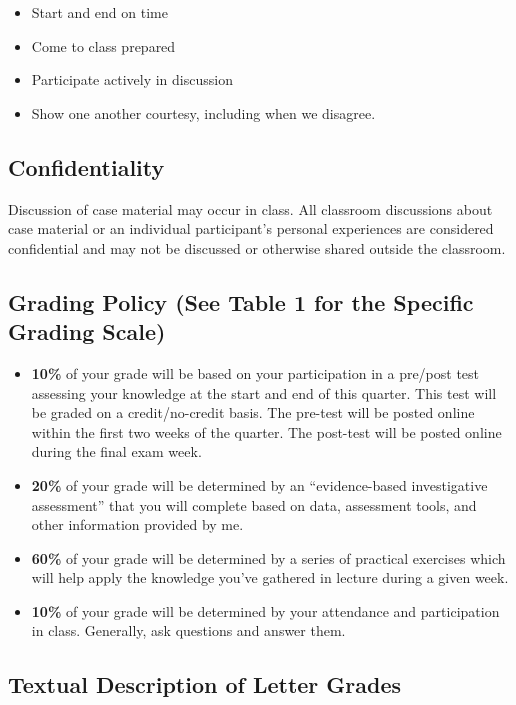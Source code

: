 \documentclass[11pt,]{article}
\providecommand{\tightlist}{%
  \setlength{\itemsep}{0pt}\setlength{\parskip}{0pt}}
\begin{document}
\begin{itemize}
\tightlist
\item
  Start and end on time
\item
  Come to class prepared
\item
  Participate actively in discussion
\item
  Show one another courtesy, including when we disagree.
\end{itemize}

\subsection{Confidentiality}\label{confidentiality}

Discussion of case material may occur in class. All classroom
discussions about case material or an individual participant's personal
experiences are considered confidential and may not be discussed or
otherwise shared outside the classroom.

\subsection{Grading Policy (See Table 1 for the Specific Grading
Scale)}\label{grading-policy-see-table-1-for-the-specific-grading-scale}

\begin{itemize}
\item
  \textbf{10\%} of your grade will be based on your participation in a
  pre/post test assessing your knowledge at the start and end of this
  quarter. This test will be graded on a credit/no-credit basis. The
  pre-test will be posted online within the first two weeks of the
  quarter. The post-test will be posted online during the final exam
  week.
\item
  \textbf{20\%} of your grade will be determined by an ``evidence-based
  investigative assessment'' that you will complete based on data,
  assessment tools, and other information provided by me.
\item
  \textbf{60\%} of your grade will be determined by a series of
  practical exercises which will help apply the knowledge you've
  gathered in lecture during a given week.
\item
  \textbf{10\%} of your grade will be determined by your attendance and
  participation in class. Generally, ask questions and answer them.
\end{itemize}

\subsection{Textual Description of Letter
Grades}\label{textual-description-of-letter-grades}
\end{document}
